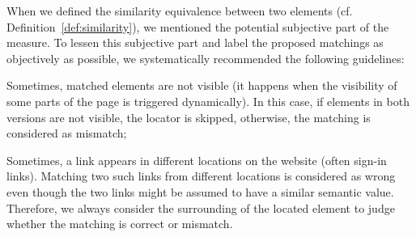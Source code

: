 When we defined the similarity equivalence between two elements (cf. Definition~\ref{def:similarity}), we mentioned the potential subjective part of the measure.
To lessen this subjective part and label the proposed matchings as objectively as possible, we systematically recommended the following guidelines:
\begin{compactenum}
    \item Sometimes, matched elements are not visible (it happens when the visibility of some parts of the page is triggered dynamically).
    In this case, if elements in both versions are not visible, the locator is skipped, otherwise, the matching is considered as \textsf{mismatch};
    \item Sometimes, a link appears in different locations on the website (often sign-in links).
    Matching two such links from different locations is considered as wrong even though the two links might be assumed to have a similar semantic value.
    Therefore, we always consider the surrounding of the located element to judge whether the matching is \textsf{correct} or \textsf{mismatch}.
\end{compactenum}


